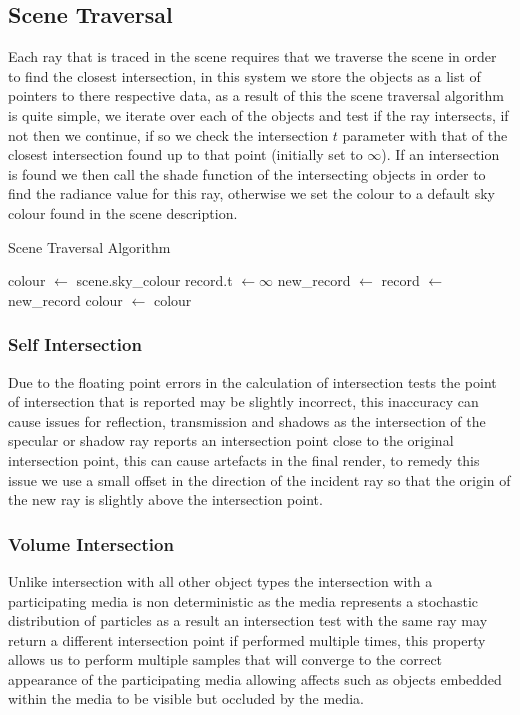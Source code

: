 \subsection{Scene Traversal}
Each ray that is traced in the scene requires that we traverse the scene in order to find the closest intersection, in
this system we store the objects as a list of pointers to there respective data, as a result of this the scene traversal
algorithm is quite simple, we iterate over each of the objects and test if the ray intersects, if not then we continue, if
so we check the intersection $t$ parameter with that of the closest intersection found up to that point
(initially set to $\infty$). If an intersection is found we then call the shade function of the intersecting objects in
order to find the radiance value for this ray, otherwise we set the colour to a default sky colour found in the scene
description.

\begin{algorithm}
\begin{algorithmic}
\caption{Scene Traversal Algorithm}
\State colour   $\gets$ scene.sky\_colour
\State record.t $\gets \infty$
	\State new\_record $\gets$ 
	\State record $\gets$ new\_record
	\EndIf
\EndFor
{}
	\State colour $\gets$ 
\EndIf
\State \Return colour
\end{algorithmic}
\end{algorithm}

\subsubsection{Self Intersection}
Due to the floating point errors in the calculation of intersection tests the point of intersection that is reported may be
slightly incorrect, this inaccuracy can cause issues for reflection, transmission and shadows as the intersection of the
specular or shadow ray reports an intersection point close to the original intersection point, this can cause artefacts in
the final render, to remedy this issue we use a small offset in the direction of the incident ray so that the origin of the
new ray is slightly above the intersection point.

\subsubsection{Volume Intersection}
Unlike intersection with all other object types the intersection with a participating media is non deterministic as the
media represents a stochastic distribution of particles as a result an intersection test with the same ray may return
a different intersection point if performed multiple times, this property allows us to perform multiple samples that
will converge to the correct appearance of the participating media allowing affects such as objects embedded within
the media to be visible but occluded by the media.

